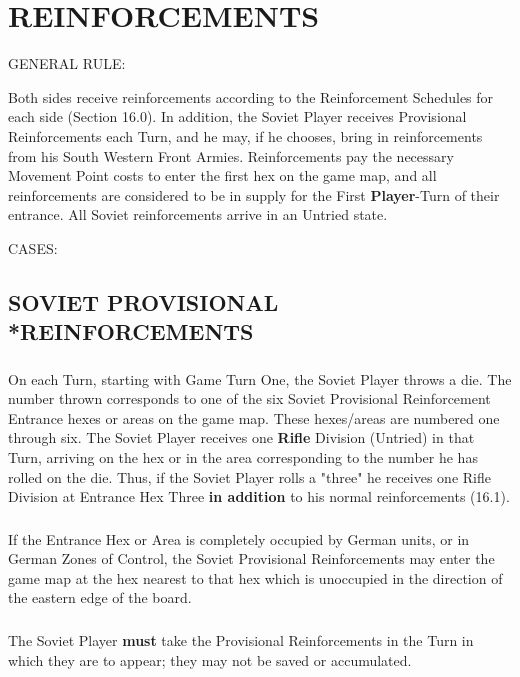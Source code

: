 \section{REINFORCEMENTS}

GENERAL RULE:

Both sides receive reinforcements according to the Reinforcement Schedules for each side (Section 16.0). In addition, the Soviet Player receives Provisional Reinforcements each Turn, and he may, if he chooses, bring in reinforcements from his South Western Front Armies. Reinforcements pay the necessary Movement Point costs to enter the first hex on the game map, and all reinforcements are considered to be in supply for the First \textbf{Player}-Turn of their entrance. All Soviet reinforcements arrive in an Untried state.

CASES:

\subsection{SOVIET PROVISIONAL\\*REINFORCEMENTS}

\subsubsection{} On each Turn, starting with Game Turn One, the Soviet Player throws a die. The number thrown corresponds to one of the six Soviet Provisional Reinforcement Entrance hexes or areas on the game map. These hexes/areas are numbered one through six. The Soviet Player receives one \textbf{Rifle} Division (Untried) in that Turn, arriving on the hex or in the area corresponding to the number he has rolled on the die. Thus, if the Soviet Player rolls a "three" he receives one Rifle Division at Entrance Hex Three \textbf{in addition} to his normal reinforcements (16.1).

\subsubsection{} If the Entrance Hex or Area is completely occupied by German units, or in German Zones of Control, the Soviet Provisional Reinforcements may enter the game map at the hex nearest to that hex which is unoccupied in the direction of the eastern edge of the board.

\subsubsection{} The Soviet Player \textbf{must} take the Provisional Reinforcements in the Turn in which they are to appear; they may not be saved or accumulated.

